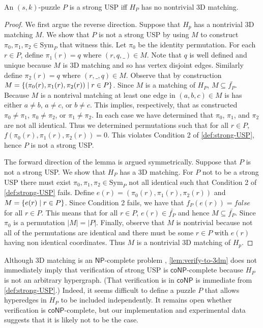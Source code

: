 \documentclass[11pt]{article}
\newcommand\sse{\subseteq}
\newcommand\Sym[1]{\ensuremath{\mathrm{Sym}_{#1}}}
\newcommand\condset[2]{\set{#1 \;|\; #2}}
\renewcommand\NP{\ensuremath{\mathsf{NP}}}
\newcommand\coNP{\ensuremath{\mathsf{coNP}}}
\begin{document}
\begin{lemma}
  \label{lem:verify-to-3dm}
  An $(s,k)$-puzzle $P$ is a strong USP iff $H_P$ has no nontrivial 3D
  matching.
\end{lemma}

\begin{proof}
  We first argue the reverse direction.  Suppose that $H_p$ has a
  nontrivial 3D matching $M$.  We show that $P$ is not a strong USP by
  using $M$ to construct $\pi_0, \pi_1, \pi_2 \in \Sym{P}$ that
  witness this.  Let $\pi_0$ be the identity permutation.  For each $r
  \in P$, define $\pi_1(r) = q$ where $(r,q,\_) \in M$.  Note that $q$
  is well defined and unique because $M$ is 3D matching and so has vertex
  disjoint edges.  Similarly define $\pi_2(r) = q$ where $(r,\_,q) \in
  M$.  Observe that by construction $M =
  \condset{(\pi_0(r),\pi_1(r),\pi_2(r))}{r \in P}$.  Since $M$ is a
  matching of $H_P$, $M \sse \bar{f_P}$.  Because $M$ is a nontrival
  matching at least one edge in $(a,b,c) \in M$ is has either $a \neq
  b$, $a \neq c$, or $b \neq c$.  This implies, respectively, that as
  constructed $\pi_0 \neq \pi_1$, $\pi_0 \neq \pi_2$, or $\pi_1 \neq
  \pi_2$.  In each case we have determined that $\pi_0$, $\pi_1$, and
  $\pi_2$ are not all identical.  Thus we determined permutations such
  that for all $r \in P$, $f(\pi_0(r), \pi_1(r), \pi_2(r)) = 0$.  This
  violates Condition 2 of \autoref{def:strong-USP}, hence $P$ is not a
  strong USP.

  The forward direction of the lemma is argued symmetrically.  Suppose
  that $P$ is not a strong USP. We show that $H_P$ has a 3D matching.
  For $P$ not to be a strong USP there must exist $\pi_0, \pi_1, \pi_2
  \in \Sym{P}$ not all identical such that Condition 2 of
  \autoref{def:strong-USP} fails.  Define $e(r) =
  (\pi_0(r),\pi_1(r),\pi_2(r))$ and $M = \condset{e(r)}{r \in P}$.
  Since Condition 2 fails, we have that $f_P(e(r)) = false$ for all $r
  \in P$.  This means that for all $r \in P$, $e(r) \in \bar{f_P}$ and
  hence $M \sse \bar{f_P}$.  Since $\pi_0$ is a permutation $|M| =
  |P|$.  Finally, observe that $M$ is nontrivial because not all of
  the permutations are identical and there must be some $r \in P$ with
  $e(r)$ having non identical coordinates.  Thus $M$ is a nontrivial
  3D matching of $H_p$.
\end{proof}

Although 3D matching is an \NP-complete problem \cite{karp72},
\autoref{lem:verify-to-3dm} does not immediately imply that
verification of strong USP is \coNP-complete because $H_P$ is not an
arbitrary hypergraph.  (That verification is in \coNP{} is immediate
from \autoref{def:strong-USP}.)  Indeed, it seems difficult to define a
puzzle $P$ that allows hyperedges in $H_P$ to be included
independently.  It remains open whether verification is
\coNP-complete, but our implementation and experimental data suggests
that it is likely not to be the case.
\end{document}

